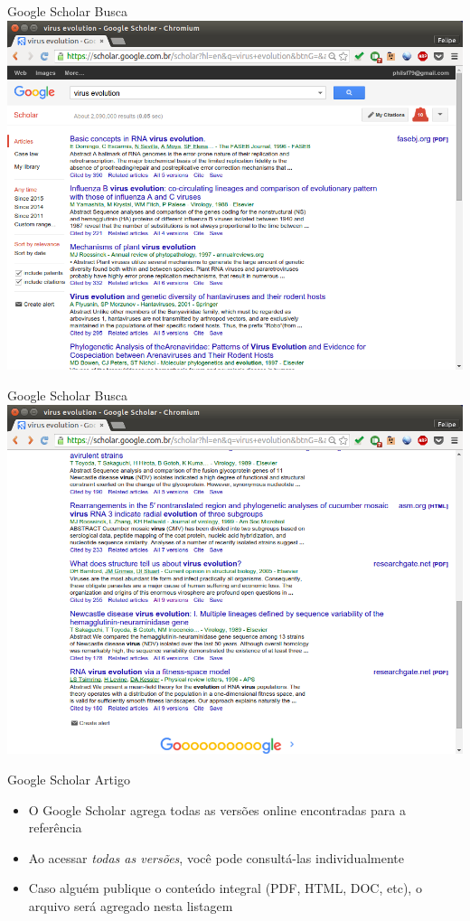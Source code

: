 \documentclass{beamer}
\begin{document}
\begin{frame}{Google Scholar Busca}
  \includegraphics[height=.85\textheight]{Busca/scholar-busca1}
\end{frame}

\begin{frame}{Google Scholar Busca}
  \includegraphics[height=.85\textheight]{Busca/scholar-busca2}
\end{frame}

\begin{frame}{Google Scholar Artigo}
  \begin{itemize}
  \item O Google Scholar agrega todas as versões online encontradas
    para a referência
  \item Ao acessar {\em todas as versões}, você pode consultá-las
    individualmente
  \item Caso alguém publique o conteúdo integral (PDF, HTML, DOC,
    etc), o arquivo será agregado nesta listagem
  \end{itemize}
\end{frame}
\end{document}
